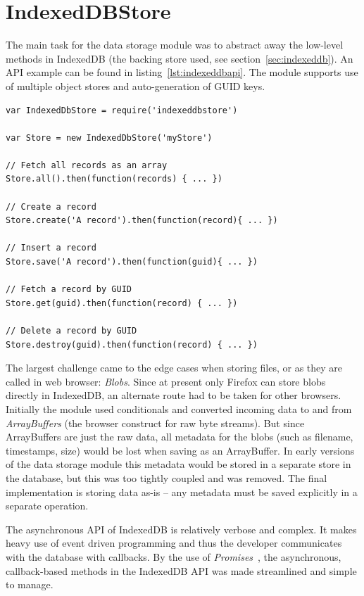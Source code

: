 \section{IndexedDBStore}
\label{sec:indexeddbstore}

The main task for the data storage module was to abstract away the low-level methods in IndexedDB (the backing store used, see section~\ref{sec:indexeddb}). An API example can be found in listing~\ref{lst:indexeddbapi}. The module supports use of multiple object stores and auto-generation of GUID keys.

\begin{Code}
\begin{lstlisting}[caption={Common database operations}, label={lst:indexeddbapi}]
var IndexedDbStore = require('indexeddbstore')

var Store = new IndexedDbStore('myStore')

// Fetch all records as an array
Store.all().then(function(records) { ... })

// Create a record
Store.create('A record').then(function(record){ ... })

// Insert a record
Store.save('A record').then(function(guid){ ... })

// Fetch a record by GUID
Store.get(guid).then(function(record) { ... })

// Delete a record by GUID
Store.destroy(guid).then(function(record) { ... })
\end{lstlisting}
\end{Code}

The largest challenge came to the edge cases when storing files, or as they are called in web browser: \emph{Blobs}. Since at present only Firefox can store blobs directly in IndexedDB, an alternate route had to be taken for other browsers. Initially the module used conditionals and converted incoming data to and from \emph{ArrayBuffers} (the browser construct for raw byte streams). But since ArrayBuffers are just the raw data, all metadata for the blobs (such as filename, timestamps, size) would be lost when saving as an ArrayBuffer. In early versions of the data storage module this metadata would be stored in a separate store in the database, but this was too tightly coupled and was removed. The final implementation is storing data as-is – any metadata must be saved explicitly in a separate operation.

The asynchronous API of IndexedDB is relatively verbose and complex. It makes heavy use of event driven programming and thus the developer communicates with the database with callbacks. By the use of \emph{Promises}~\cite{Promises:Online}, the asynchronous, callback-based methods in the IndexedDB API was made streamlined and simple to manage.

